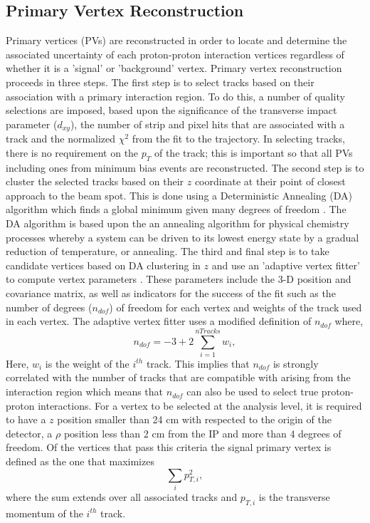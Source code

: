 \subsection{Primary Vertex Reconstruction}
Primary vertices (PVs) are reconstructed in order to 
locate and determine the associated uncertainty of each
proton-proton interaction vertices regardless of whether it is a 'signal' or 'background' vertex.
Primary vertex reconstruction proceeds in three steps.
The first step is to select tracks based on their association with a primary interaction region.
To do this, a number of quality selections are imposed, based upon the significance of the
transverse impact parameter ($d_{xy}$), the number of strip and pixel hits that are 
associated with a track and the normalized $\chi^{2}$ from the fit to the
trajectory. In selecting tracks, there is no requirement on the $p_{T}$ of the track; 
this is important so that all PVs including ones from minimum bias events are reconstructed.
The second step is to cluster the selected tracks based on their $z$ coordinate at their
point of closest approach to the beam spot. This is done using a Deterministic Annealing (DA)
algorithm which finds a global minimum given many degrees of freedom \cite{DAAnnealing}.
The DA algorithm is based upon the %
an annealing algorithm for physical chemistry processes whereby
a system can be driven to its lowest energy state by a gradual reduction
of temperature, or annealing. %
The third and final step is to take candidate vertices based on DA clustering in $z$ and use
an 'adaptive vertex fitter'  
to compute vertex parameters \cite{KalmanFilter}. These parameters include the 3-D position and covariance matrix,
as well as indicators for the success of the fit such as the number of degrees ($n_{dof}$) of freedom for
each vertex and weights of the track used in each vertex. The adaptive vertex fitter
uses a modified definition of $n_{dof}$ where,
\begin{equation}
n_{dof} = -3+2\sum^{nTracks}_{i=1} w_{i},
\end{equation}
Here, $w_{i}$ is the weight of the $i^{th}$ track. This implies that $n_{dof}$ is strongly
correlated with the number of tracks that are compatible with arising from the interaction
region which means that $n_{dof}$ can also be used to select true proton-proton interactions.
For a vertex to be selected at the analysis level, it is required to have a $z$ position
smaller than 24 cm with respected to the origin of the detector, a $\rho$ position
less than 2 cm from the IP and more than 4 degrees of freedom. Of the vertices
that pass this criteria the signal primary vertex is defined as the one that maximizes
\begin{equation}
\sum_{i} p_{T,i}^{2},
\end{equation}
where the sum extends over all associated tracks and $p_{T,i}$ is the transverse momentum
of the $i^{th}$ track.

